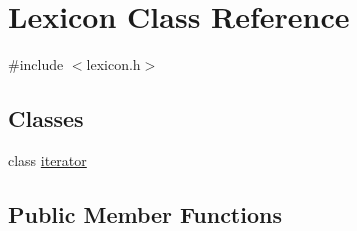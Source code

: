 \hypertarget{classLexicon}{}\section{Lexicon Class Reference}
\label{classLexicon}


{\ttfamily \#include $<$lexicon.\+h$>$}

\subsection*{Classes}
\begin{DoxyCompactItemize}
\item 
class \mbox{\hyperlink{classLexicon_1_1iterator}{iterator}}
\end{DoxyCompactItemize}
\subsection*{Public Member Functions}
